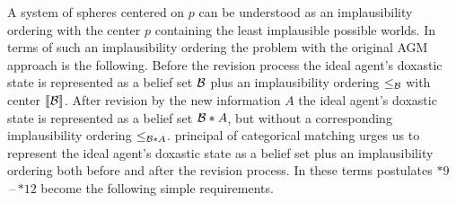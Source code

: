 A system of spheres centered on $p$ can be understood as an implausibility ordering with the center $p$ containing the least implausible possible worlds. In terms of such an implausibility ordering the problem with the original AGM approach is the following. Before the revision process the ideal agent's doxastic state is represented as a belief set $\cal B$ plus an implausibility ordering $\leq_{\cal B}$ with center $\llbracket\cal B\rrbracket$. After revision by the new information $A$ the ideal agent's doxastic state is represented as a belief set $\begin{cal}B\end{cal}*A$, but without a corresponding implausibility ordering $\leq_{\begin{cal}B\end{cal}*A}$.  principal of categorical matching urges us to represent the ideal agent's doxastic state as a belief set plus an implausibility ordering both before and after the revision process. In these terms  postulates $*9$\,--\,$*12$ become the following simple requirements.


